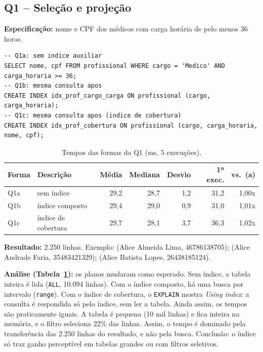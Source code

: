 \documentclass[10pt,a4paper]{article}
\begin{document}
\subsection{Q1 -- Seleção e projeção}
\textbf{Especificação:} nome e CPF dos médicos com carga horária de pelo menos 36 horas.

\begin{lstlisting}
-- Q1a: sem indice auxiliar
SELECT nome, cpf FROM profissional WHERE cargo = 'Medico' AND carga_horaria >= 36;
-- Q1b: mesma consulta apos
CREATE INDEX idx_prof_cargo_carga ON profissional (cargo, carga_horaria);
-- Q1c: mesma consulta apos (indice de cobertura)
CREATE INDEX idx_prof_cobertura ON profissional (cargo, carga_horaria, nome, cpf);
\end{lstlisting}

\begin{table}[H]\centering\footnotesize
\caption{Tempos das formas da Q1 (ms, 5 execuções).}\label{tab:q1}
\begin{tabular}{llrrrrr}\toprule
Forma & Descrição & Média & Mediana & Desvio & 1ª exec. & vs.\ (a) \\ \midrule
Q1a & sem índice           & 29,2 & 28,7 & 1,2 & 31,2 & 1,00x \\
Q1b & índice composto      & 29,4 & 29,0 & 0,9 & 31,0 & 1,01x \\
Q1c & índice de cobertura  & 29,7 & 28,1 & 3,7 & 36,3 & 1,02x \\ \bottomrule
\end{tabular}
\end{table}

\textbf{Resultado:} 2.250 linhas. Exemplo: (Alice Almeida Lima, 46786138705); (Alice Andrade Faria, 35483421329); (Alice Batista Lopes, 26438185124).

\textbf{Análise (Tabela~\ref{tab:q1}):} os planos mudaram como esperado. Sem índice, a tabela inteira é lida (\texttt{ALL}, 10.094 linhas). Com o índice composto, há uma busca por intervalo (\texttt{range}). Com o índice de cobertura, o \texttt{EXPLAIN} mostra \emph{Using index}: a consulta é respondida só pelo índice, sem ler a tabela. Ainda assim, os tempos são praticamente iguais. A tabela é pequena (10 mil linhas) e fica inteira na memória, e o filtro seleciona 22\% das linhas. Assim, o tempo é dominado pela transferência das 2.250 linhas do resultado, e não pela busca. Conclusão: o índice só traz ganho perceptível em tabelas grandes ou com filtros seletivos.
\end{document}
